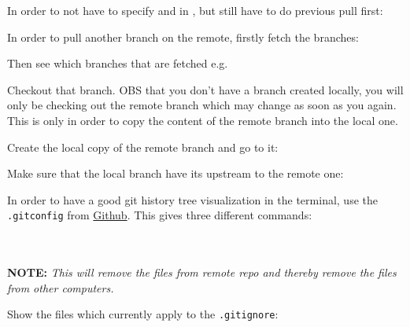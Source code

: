 
In order to not have to specify  and  in , but still have to do previous pull first:



In order to pull another branch on the remote, firstly fetch the branches:


Then see which branches that are fetched e.g.


Checkout that branch. OBS that you don't have a branch created locally, you will only be checking out the remote branch which may change as soon as you  again. This is only in order to copy the content of the remote branch into the local one.


Create the local copy of the remote branch and go to it:


Make sure that the local branch have its upstream to the remote one:



In order to have a good git history tree visualization in the terminal, use the \texttt{.gitconfig} from \href{https://github.com/robinhellmers/computer_setup/blob/master/git_setup/gitconfig}{Github}. This gives three different commands:\\
\\
\\


\textbf{NOTE:} \textit{This will remove the files from remote repo and thereby remove the files from other computers.}

Show the files which currently apply to the \texttt{.gitignore}:


